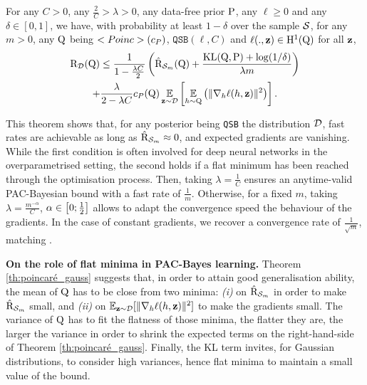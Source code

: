 \begin{theorem}\label{th:poincaré_gauss}
For any $C>0$, any $\frac{2}{C}>\lambda >0$, any data-free prior $\P$, any  $\ell\geq 0$ and any $\delta\in [0,1]$, we have, with probability at least $1-\delta$ over the sample $\S$, for any $m>0$, any $\Q$ being $\Poinc(c_P)$, $\texttt{QSB}(\ell,C)$ and $\ell(.,\z)\in \mathrm{H}^{1}(\Q)$ for all $\z$,
\begin{multline*}
\Risk_{\D}(\Q) \leq \frac{1}{1-\frac{\lambda C}{2}} \LP \hat{\Risk}_{\S_m}(\Q) + \frac{\KL(\Q,\P) +\log(1/\delta)}{\lambda m} \RP \\
+ \frac{\lambda}{2-\lambda C} c_{P}(\Q)\EE_{\z\sim\D} \LB \EE_{h\sim \Q}\LP \|\nabla_h \ell(h,\z)\|^2 \RP \RB.
\end{multline*}
\end{theorem}
This theorem shows that, for any posterior being \texttt{QSB} \wrt the distribution $\D$, fast rates are achievable as long as $\hat{\Risk}_{\S_m}\approx 0$, and expected gradients are vanishing.
While the first condition is often involved for deep neural networks in the overparametrised setting, the second holds if a flat minimum has been reached through the optimisation process.
Then, taking $\lambda = \frac{1}{C}$ ensures an anytime-valid PAC-Bayesian bound with a fast rate of $\frac{1}{m}$.
Otherwise, for a fixed $m$, taking $\lambda= \frac{m^{-\alpha}}{C}$, $\alpha \in \LB0;\frac{1}{2}\RB$ allows to adapt the convergence speed \wrt the behaviour of the gradients. 
In the case of constant gradients, we recover a convergence rate of $\frac{1}{\sqrt{m}}$, matching \citet[Theorem 4.1]{alquier2016properties}. 

  
\noindent\textbf{On the role of flat minima in PAC-Bayes learning.} 
Theorem \ref{th:poincaré_gauss} suggests that, in order to attain good generalisation ability, the mean of $\Q$ has to be close from two minima: 
\emph{(i)} on $\hat{\Risk}_{\S_m}$ in order to make $\hat{\Risk}_{\S_m}$ small, and \emph{(ii)} on $\Ebb_{\z\sim\D}[\|\nabla_h \ell(h,\z)\|^2]$  to make the gradients small. The variance of $\Q$ has to fit the flatness of those minima, the flatter they are, the larger the variance in order to shrink the expected terms on the right-hand-side of Theorem \ref{th:poincaré_gauss}. Finally, the KL term invites, \eg for Gaussian distributions, to consider high variances, hence flat minima to maintain a small value of the bound.
  
